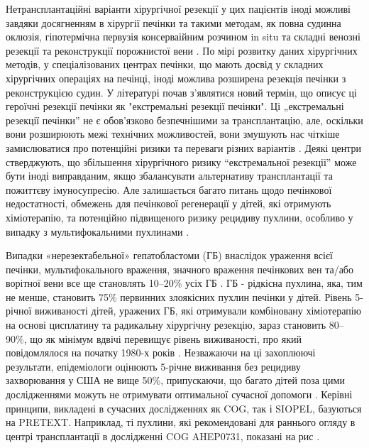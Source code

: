 Нетрансплантаційні варіанти хірургічної резекції у цих пацієнтів іноді можливі завдяки досягненням в хірургії печінки та такими методам, як повна судинна оклюзія, гіпотермічна первузія консерваійним розчином in situ та складні венозні резекції та реконструкції порожнистої вени \cite{pmid12461796}. По мірі розвитку даних хірургічних методів, у спеціалізованих центрах печінки, що мають досвід у складних хірургічних операціях на печінці, іноді можлива розширена резекція печінки з реконструкцією судин. У літературі почав з'являтися новий термін, що описує ці героїчні резекції печінки як "екстремальні резекції печінки". Ці „екстремальні резекції печінки” не є обов’язково безпечнішими за трансплантацію, але, оскільки вони розширюють межі технічних можливостей, вони змушують нас чіткіше замислюватися про потенційні ризики та переваги різних варіантів \cite{pmid12115331}. Деякі центри стверджують, що збільшення хірургічного ризику “екстремальної резекції” може бути іноді виправданим, якщо збалансувати альтернативу трансплантації та пожиттєву імуносупресію. Але залишається багато питань щодо печінкової недостатності, обмежень для печінкової регенерації у дітей, які отримують хіміотерапію, та потенційно підвищеного ризику рецидиву пухлини, особливо у випадку з мультифокальними пухлинами \cite{pmid10466608}. 

Випадки «нерезектабельної» гепатобластоми (ГБ) внаслідок ураження всієї печінки, мультифокального враження, значного враження печінкових вен та/або ворітної вени все ще становлять 10–20\% усіх ГБ \cite{pmid14966740}. ГБ - рідкісна пухлина, яка, тим не менше, становить 75\% первинних злоякісних пухлин печінки у дітей. Рівень 5-річної виживаності дітей, уражених ГБ, які отримували комбіновану хіміотерапію на основі цисплатину та радикальну хірургічну резекцію, зараз становить 80–90\%, що як мінімум вдвічі перевищує рівень виживаності, про який повідомлялося на початку 1980-х років \cite{pmid21509775}. Незважаючи на ці захоплюючі результати, епідеміологи оцінюють 5-річне виживання без рецидиву захворювання у США не вище 50\%, припускаючи, що багато дітей поза цими дослідженнями можуть не отримувати оптимальної сучасної допомоги \cite{pmid18560935}. Керівні принципи, викладені в сучасних дослідженнях як COG, так і SIOPEL, базуються на PRETEXT. Наприклад, ті пухлини, які рекомендовані для раннього огляду  в центрі трансплантації в дослідженні COG AHEP0731, показані на рис \cite{pmid7796018}.
